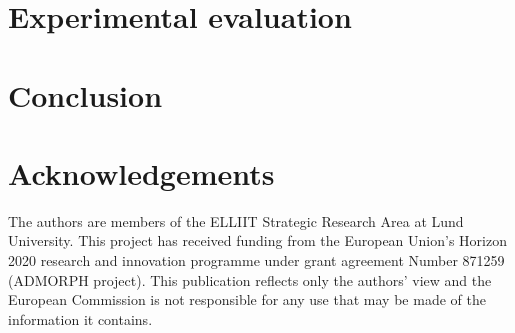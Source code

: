 \section{\tool}
\label{sec:code}
 

\section{Experimental evaluation}
\label{sec:experiment} 


\section{Conclusion}
\label{sec:conclusion}


\section*{Acknowledgements}
The authors are members of the ELLIIT Strategic Research Area at Lund University. 
This project has received funding from the European Union's Horizon 2020 research and innovation programme under grant agreement Number 871259 (ADMORPH project). 
This publication reflects only the authors' view and the European Commission is not responsible for any use that may be made of the information it contains.


\printbibliography[heading=subbibliography]
